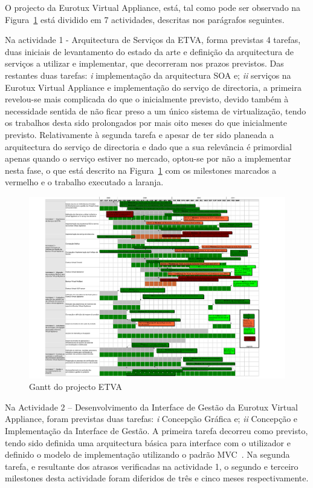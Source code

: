 \documentclass[a4paper,12pt,portugues]{article}
\begin{document}
O projecto da Eurotux Virtual Appliance, está, tal como pode ser observado na
Figura~\ref{fig:gantt} está dividido em 7 actividades, descritas nos parágrafos seguintes.

Na actividade 1 - Arquitectura de Serviços da ETVA, forma previstas 4 tarefas,
duas iniciais de levantamento do estado da arte e definição da arquitectura de
serviços a utilizar e implementar, que decorreram nos prazos previstos. Das
restantes duas tarefas: \emph{i} implementação da arquitectura SOA e;
\emph{ii} serviços na Eurotux Virtual Appliance e implementação do serviço de
directoria, a primeira revelou-se mais complicada do que o inicialmente
previsto, devido também à necessidade sentida de não ficar preso a um único
sistema de virtualização, tendo os trabalhos desta sido prolongados por mais
oito meses do que inicialmente previsto. Relativamente à segunda tarefa e
apesar de ter sido planeada a arquitectura do serviço de directoria e dado que
a sua relevância é primordial apenas quando o serviço estiver no mercado,
optou-se por não a implementar nesta fase, o que está descrito na
Figura~\ref{fig:gantt} com os milestones marcados a vermelho e o trabalho
executado a laranja.

\begin{figure}[htbp]
	\centering
	\begin{turn}{90}
		\includegraphics[scale=.65]{gantt}
	\end{turn}
	\caption{Gantt do projecto ETVA}
	\label{fig:gantt}
\end{figure}

Na Actividade 2 – Desenvolvimento da Interface de Gestão da Eurotux Virtual
Appliance, foram previstas duas tarefas: \emph{i} Concepção Gráfica e;
\emph{ii} Concepção e Implementação da Interface de Gestão. A primeira tarefa
decorreu como previsto, tendo sido definida uma arquitectura básica para
interface com o utilizador e definido o modelo de implementação utilizando o
padrão MVC~\cite{mvc}. Na segunda tarefa, e resultante dos atrasos verificadas
na actividade 1, o segundo e terceiro milestones desta actividade foram
diferidos de três e cinco meses respectivamente.
\end{document}
